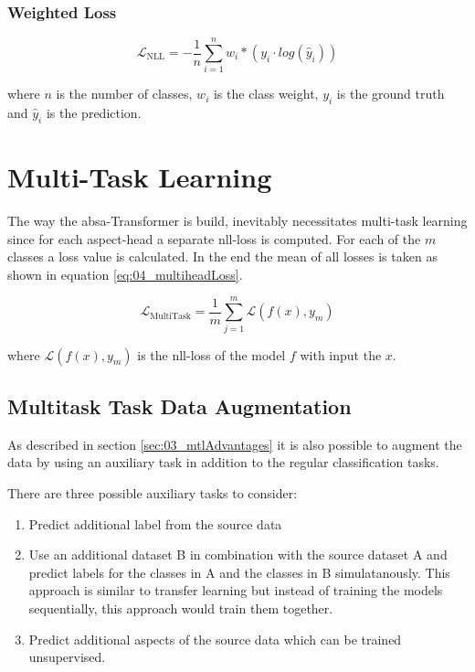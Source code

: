 \subsubsection*{Weighted Loss}

\begin{equation}
\mathcal{L}_\text{NLL}=-\frac{1}{n}\sum_{i=1}^{n} w_i * (y_i \cdot log(\hat{y}_i))
\label{eq:04_nll}
\end{equation}

where $n$ is the number of classes, $w_i$ is the class weight, $y_i$ is the ground truth and $\hat{y}_i$ is the prediction.

\section{Multi-Task Learning}

The way the \gls{absa}-Transformer is build, inevitably necessitates multi-task learning since for each aspect-head a separate \gls{nll}-loss is computed. For each of the $m$ classes a loss value is calculated. In the end the mean of all losses is taken as shown in equation \ref{eq:04_multiheadLoss}.

\begin{equation}
\mathcal{L}_\text{MultiTask} = \frac{1}{m}\sum_{j=1}^{m}\mathcal{L}(f(x), y_m)
\label{eq:04_multiheadLoss}
\end{equation}

where $\mathcal{L}(f(x), y_m)$ is the \gls{nll}-loss of the model $f$ with input the $x$.

\subsection*{Multitask Task Data Augmentation}

As described in section \ref{sec:03_mtlAdvantages} it is also possible to augment the data by using an auxiliary task in addition to the regular classification tasks.

There are three possible auxiliary tasks to consider:


\begin{enumerate}
	\item Predict additional label from the source data
	\item Use an additional dataset B in combination with the source dataset A and predict labels for the classes in A and the classes in B simulatanously. This approach is similar to transfer learning but instead of training the models sequentially, this approach would train them together.
	\item Predict additional aspects of the source data which can be trained unsupervised.
\end{enumerate}

